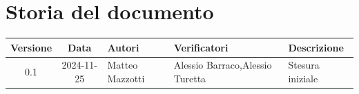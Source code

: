 \section*{Storia del documento}
\begin{tabularx}{\textwidth}{ c c p{2.75cm} p{2.75cm} X }
    \rowcolor{gray!20}\rule{0pt}{0.5cm}\textbf{Versione} & \textbf{Data} & \textbf{Autori} & \textbf{Verificatori} & \textbf{Descrizione} \\[0.7ex]
    \hline
    \rule{0pt}{0.5cm}0.1 & 2024-11-25 & Matteo Mazzotti & Alessio Barraco,\newline Alessio Turetta & Stesura iniziale \\[0.7ex]
\end{tabularx}
